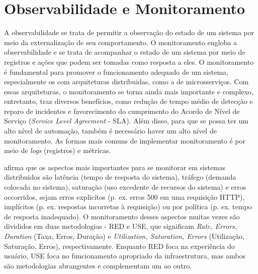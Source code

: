 
\section{Observabilidade e Monitoramento}
A observabilidade se trata de permitir a observação do estado de um sistema por meio da externalização de seu comportamento. O monitoramento engloba a observabilidade e se trata de acompanhar o estado de um sistema por meio de registros e ações que podem ser tomadas como resposta a eles. O monitoramento é fundamental para promover o funcionamento adequado de um sistema, especialmente os com arquiteturas distribuidas, como a de microsserviços. Com essas arquiteturas, o monitoramento se torna ainda mais importante e complexo, entretanto, traz diversos benefícios, como redução de tempo médio de detecção e reparo de incidentes e favorecimento do cumprimento do Acordo de Nível de Serviço (\emph{Service Level Agreement} - SLA). Além disso, para que se possa ter um alto nível de automação, também é necessário haver um alto nível de monitoramento. As formas mais comuns de implementar monitoramento é por meio de \emph{logs} (registros) e métricas.

 afirma que os aspectos mais importantes para se monitorar em sistemas distribuidos são latência (tempo de resposta do sistema), tráfego (demanda colocada no sistema), saturação (uso excedente de recursos do sistema) e erros occorridos, sejam erros explicítos (p. ex. erros 500 em uma requisição HTTP), implícitos (p. ex. respostas incorretas à requisição) ou por política (p. ex. tempo de resposta inadequado). O monitoramento desses aspectos muitas vezes são divididos em duas metodologias - RED e USE, que significam \emph{Rate, Errors, Duration} (Taxa, Erros, Duração) e \emph{Utilization, Saturation, Errors} (Utilização, Saturação, Erros), respectivamente. Enquanto RED foca na experiência do usuário, USE foca no funcionamento apropriado da infraestrutura, mas ambos são metodologias abrangentes e complementam um ao outro. \cite{livro-sre-google, grafana-blog}


